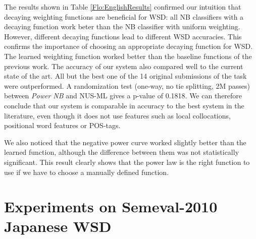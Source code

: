 \documentclass[english]{jnlp_1.4}
\begin{document}
The results shown in Table \ref{Flo:EnglishResults} confi{}rmed our
intuition that decaying weighting functions are benefi{}cial for WSD:
all NB classifiers with a decaying function work beter than the NB
classifier with uniform weighting. However, different decaying functions
lead to different WSD accuracies. This confirms the importance of
choosing an appropriate decaying function for WSD. The learned weighting
function worked better than the baseline functions of the previous
work. The accuracy of our system also compared well to the current
state of the art. All but the best one of the 14 original submissions
of the task \cite{semeval07ELS} were outperformed. A randomization
test (one-way, no tie splitting, 2M passes) between \emph{Power NB
}and NUS-ML gives a p-value of 0.1818. We can therefore conclude that
our system is comparable in accuracy to the best system in the literature,
even though it does not use features such as local collocations, positional
word features or POS-tags. 

We also noticed that the negative power curve worked slightly better
than the learned function, although the difference between them was
not statistically significant. This result clearly shows that the
power law is the right function to use if we have to choose a manually
defined function.



\section{Experiments on Semeval-2010 Japanese WSD}
\label{sec:Experiments-Japanese}
\end{document}

